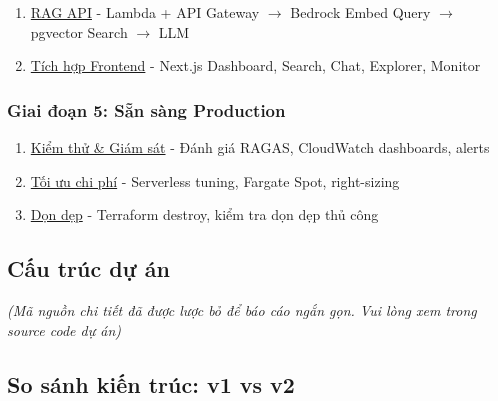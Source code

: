 \begin{enumerate}
\def\labelenumi{\arabic{enumi}.}
\setcounter{enumi}{12}
\tightlist
\item
  \href{5.13-RAG-API/}{RAG API} - Lambda + API Gateway \(\rightarrow\)
  Bedrock Embed Query \(\rightarrow\) pgvector Search \(\rightarrow\)
  LLM
\item
  \href{5.14-Frontend/}{Tích hợp Frontend} - Next.js Dashboard, Search,
  Chat, Explorer, Monitor
\end{enumerate}

\hypertarget{giai-ux111oux1ea1n-5-sux1eb5n-suxe0ng-production}{%
\subsubsection{Giai đoạn 5: Sẵn sàng
Production}}

\begin{enumerate}
\def\labelenumi{\arabic{enumi}.}
\setcounter{enumi}{14}
\tightlist
\item
  \href{5.15-Testing/}{Kiểm thử \& Giám sát} - Đánh giá RAGAS,
  CloudWatch dashboards, alerts
\item
  \href{5.16-Cost/}{Tối ưu chi phí} - Serverless tuning, Fargate Spot,
  right-sizing
\item
  \href{5.17-Cleanup/}{Dọn dẹp} - Terraform destroy, kiểm tra dọn dẹp
  thủ công
\end{enumerate}

\hypertarget{cux1ea5u-truxfac-dux1ef1-uxe1n}{%
\subsection{Cấu trúc dự án}}

\emph{(Mã nguồn chi tiết đã được lược bỏ để báo cáo ngắn gọn. Vui lòng
xem trong source code dự án)}

\hypertarget{so-suxe1nh-kiux1ebfn-truxfac-v1-vs-v2}{%
\subsection{So sánh kiến trúc: v1 vs
v2}}

